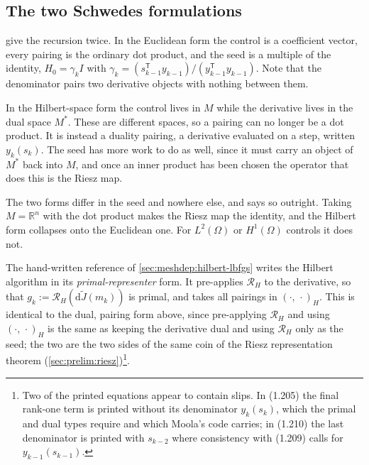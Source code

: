 \documentclass[a4paper,11pt]{article}
\newcommand{\R}{\mathbb{R}}
\newcommand{\Om}{\Omega}
\newcommand{\Lp}[1]{L^{2}(#1)}              %
\newcommand{\inner}[3]{(#1,\,#2)_{#3}}        %
\newcommand{\Rmap}{\mathcal{R}}              %
\newcommand{\Jt}{\tilde{J}}                  %
\newcommand{\Mspace}{M}
\theoremstyle{spacedplain} \newtheorem{theorem}[counter]{Theorem} \newtheorem{lemma}[counter]{Lemma} \newtheorem{prop}[counter]{Proposition} \newtheorem{cor}[counter]{Corollary}
\theoremstyle{spaceddefinition} \newtheorem{defn}[counter]{Definition} \newtheorem{example}[counter]{Example} \newtheorem{remark}[counter]{Remark}
\begin{document}
\subsection{The two Schwedes formulations}
\label{sec:lbfgs:schwedes}

 give the recursion twice. In the Euclidean form \citep[(1.187), (1.209)]{shfp2017} the control is a coefficient vector, every pairing is the ordinary dot product, and the seed is a multiple of the identity, $H_0 = \gamma_k I$ with $\gamma_k = (s_{k-1}^{\mathsf T} y_{k-1})/(y_{k-1}^{\mathsf T} y_{k-1})$. Note that the denominator pairs two derivative objects with nothing between them.

In the Hilbert-space form \citep[(1.205), (1.210)]{shfp2017} the control lives in $\Mspace$ while the derivative lives in the dual space $\Mspace^{*}$. These are different spaces, so a pairing can no longer be a dot product. It is instead a duality pairing, a derivative evaluated on a step, written $y_k(s_k)$. The seed has more work to do as well, since it must carry an object of $\Mspace^{*}$ back into $\Mspace$, and once an inner product has been chosen the operator that does this is the Riesz map.

The two forms differ in the seed and nowhere else, and \citet[(1.208) and following]{shfp2017} says so outright. Taking $\Mspace = \R^{n}$ with the dot product makes the Riesz map the identity, and the Hilbert form collapses onto the Euclidean one. For $\Lp{\Om}$ or $H^{1}(\Om)$ controls it does not.

The hand-written reference of \cref{sec:meshdep:hilbert-lbfgs} writes the Hilbert algorithm in its \emph{primal-representer} form. It pre-applies $\Rmap_H$ to the derivative, so that $g_k := \Rmap_H(\mathrm{d}\Jt(m_k))$ is primal, and takes all pairings in $\inner{\cdot}{\cdot}{H}$. This is identical to the dual, pairing form above, since pre-applying $\Rmap_H$ and using $\inner{\cdot}{\cdot}{H}$ is the same as keeping the derivative dual and using $\Rmap_H$ only as the seed; the two are the two sides of the same coin of the Riesz representation theorem (\cref{sec:prelim:riesz})\footnote{Two of the printed equations appear to contain slips. In (1.205) the final rank-one term is printed without its denominator $y_k(s_k)$, which the primal and dual types require and which Moola's code carries; in (1.210) the last denominator is printed with $s_{k-2}$ where consistency with (1.209) calls for $y_{k-1}(s_{k-1})$.}.
\end{document}
